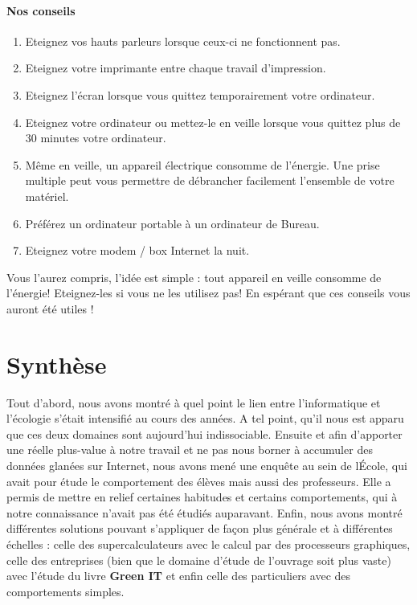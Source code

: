 \documentclass[a4paper,11pt,french]{article}
\begin{document}
\paragraph{Nos conseils}
\begin{enumerate}
\item Eteignez vos hauts parleurs lorsque ceux-ci ne fonctionnent pas.
\item Eteignez votre imprimante entre chaque travail d'impression.
\item Eteignez l'écran lorsque vous quittez temporairement votre ordinateur.
\item Eteignez votre ordinateur ou mettez-le en veille lorsque vous quittez plus de 30 minutes votre ordinateur.
\item Même en veille, un appareil électrique consomme de l'énergie. Une prise multiple peut vous permettre de débrancher facilement l'ensemble de votre matériel.
\item Préférez un ordinateur portable à un ordinateur de Bureau.
\item Eteignez votre modem / box Internet la nuit.
\end{enumerate}

Vous l'aurez compris, l'idée est simple : tout appareil en veille consomme de l'énergie! Eteignez-les si vous ne les utilisez pas!
En espérant que ces conseils vous auront été utiles !

\newpage
\section{Synthèse}

Tout d'abord, nous avons montré à quel point le lien entre l'informatique et l'écologie s'était intensifié au cours des années. A tel point, qu'il nous est apparu que ces deux domaines sont aujourd'hui indissociable. 
Ensuite et afin d'apporter une réelle plus-value à notre travail et ne pas nous borner à accumuler des données glanées sur Internet, nous avons mené une enquête au sein de l\'Ecole, qui avait pour étude le comportement des élèves mais aussi des professeurs. Elle a permis de mettre en relief certaines habitudes et certains comportements, qui à notre connaissance n'avait pas été étudiés auparavant.
Enfin, nous avons montré différentes solutions pouvant s'appliquer de façon plus générale et à différentes échelles : celle des supercalculateurs avec le calcul par des processeurs graphiques, celle des entreprises (bien que le domaine d'étude de l'ouvrage soit plus vaste) avec l'étude du livre \textbf{Green IT} et enfin celle des particuliers avec des comportements simples.
\end{document}
